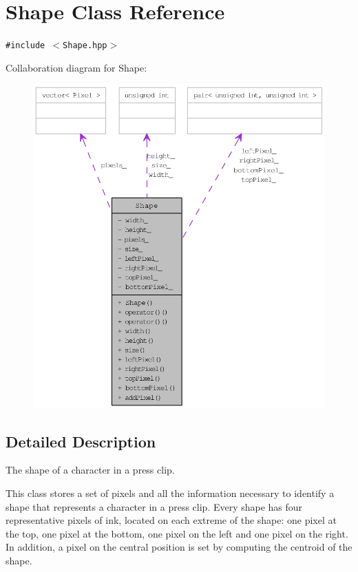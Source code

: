 \hypertarget{class_shape}{
\section{Shape Class Reference}
\label{class_shape}
}
{\tt \#include $<$Shape.hpp$>$}

Collaboration diagram for Shape:\nopagebreak
\begin{figure}[H]
\begin{center}
\leavevmode
\includegraphics[width=400pt]{class_shape__coll__graph}
\end{center}
\end{figure}


\subsection{Detailed Description}
The shape of a character in a press clip. 

This class stores a set of pixels and all the information necessary to identify a shape that represents a character in a press clip. Every shape has four representative pixels of ink, located on each extreme of the shape: one pixel at the top, one pixel at the bottom, one pixel on the left and one pixel on the right. In addition, a pixel on the central position is set by computing the centroid of the shape.

